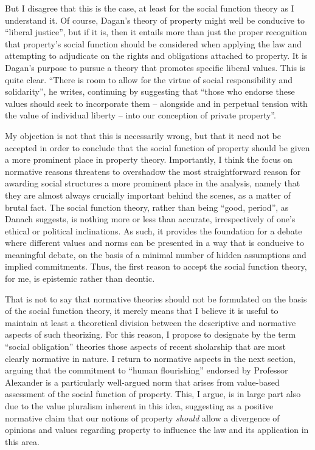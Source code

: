 But I disagree that this is the case, at least for the social function theory as I understand it. Of course, Dagan's theory of property might well be conducive to ``liberal justice'', but if it is, then it entails more than just the proper recognition that property's social function should be considered when applying the law and attempting to adjudicate on the rights and obligations attached to property. It is Dagan's purpose to pursue a theory that promotes specific liberal values. This is quite clear. ``There is room to allow for the virtue of social responsibility and solidarity'', he writes, continuing by suggesting that ``those who endorse these values should seek to incorporate them -- alongside and in perpetual tension with the value of individual liberty -- into our conception of private property''. 

My objection is not that this is necessarily wrong, but that it need not be accepted in order to conclude that the social function of property should be given a more prominent place in property theory. Importantly, I think the focus on normative reasons threatens to overshadow the most straightforward reason for awarding social structures a more prominent place in the analysis, namely that they are almost always crucially important behind the scenes, as a matter of brutal fact. The social function theory, rather than being ``good, period'', as Danach suggests, is nothing more or less than accurate, irrespectively of one's ethical or political inclinations. As such, it provides the foundation for a debate where different values and norms can be presented in a way that is conducive to meaningful debate, on the basis of a minimal number of hidden assumptions and implied commitments. Thus, the first reason to accept the social function theory, for me, is epistemic rather than deontic.

That is not to say that normative theories should not be formulated on the basis of the social function theory, it merely means that I believe it is useful to maintain at least a theoretical division between the descriptive and normative aspects of such theorizing. For this reason, I propose to designate by the term ``social obligation'' theories those aspects of recent sholarship that are most clearly normative in nature. I return to normative aspects in the next section, arguing that the commitment to ``human flourishing'' endorsed by Professor Alexander is a particularly well-argued norm that arises from value-based assessment of the social function of property. This, I argue, is in large part also due to the value pluralism inherent in this idea, suggesting as a positive normative claim that our notions of property {\it should} allow a divergence of opinions and values regarding property to influence the law and its application in this area.

